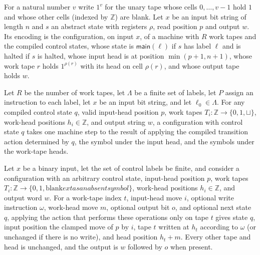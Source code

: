 \begin{definition}
\label{Complexity.CounterProg.enc}
\leanok
{}
For a natural number $v$ write $1^v$ for the unary tape whose cells $0, \dots, v-1$ hold $1$ and
whose other cells (indexed by $\mathbb{Z}$) are blank. Let $x$ be an input bit string of length
$n$ and $s$ an abstract state with registers $\rho$, read position $p$ and output $w$. Its
encoding is the configuration, on input $x$, of a machine with $R$ work tapes and the compiled
control states, whose state is $\mathsf{main}(\ell)$ if $s$ has label $\ell$ and is halted if $s$
is halted, whose input head is at position $\min(p + 1, n + 1)$, whose work tape $r$ holds
$1^{\rho(r)}$ with its head on cell $\rho(r)$, and whose output tape holds $w$.
\end{definition}

\begin{theorem}
\label{Complexity.CounterProg.step_some}
\leanok
{}
Let $R$ be the number of work tapes, let $\Lambda$ be a finite set of labels, let $P$
assign an instruction to each label, let $x$ be an input bit string, and let $\ell_0 \in
\Lambda$. For any compiled control state $q$, valid input-head position $p$, work tapes
$T_i : \mathbb{Z} \to \{0,1,\sqcup\}$, work-head positions $h_i \in \mathbb{Z}$, and
output string $w$, a configuration with control state $q$ takes one machine step to the
result of applying the compiled transition action determined by $q$, the symbol under
the input head, and the symbols under the work-tape heads.
\end{theorem}

\begin{theorem}
\label{Complexity.CounterProg.apply_act}
\leanok
{}
Let $x$ be a binary input, let the set of control labels be finite, and consider a
configuration with an arbitrary control state, input-head position $p$, work tapes
$T_i:\mathbb{Z}\to\{0,1,\text{blank}	ext{ as an absent symbol}\}$, work-head positions
$h_i\in\mathbb{Z}$, and output word $w$. For a work-tape index $t$, input-head move $i$,
optional write instruction $\omega$, work-head move $m$, optional output bit $o$, and
optional next state $q$, applying the action that performs these operations only on tape
$t$ gives state $q$, input position the clamped move of $p$ by $i$, tape $t$ written at
$h_t$ according to $\omega$ (or unchanged if there is no write), and head position
$h_t+m$. Every other tape and head is unchanged, and the output is $w$ followed by $o$
when present.
\end{theorem}

